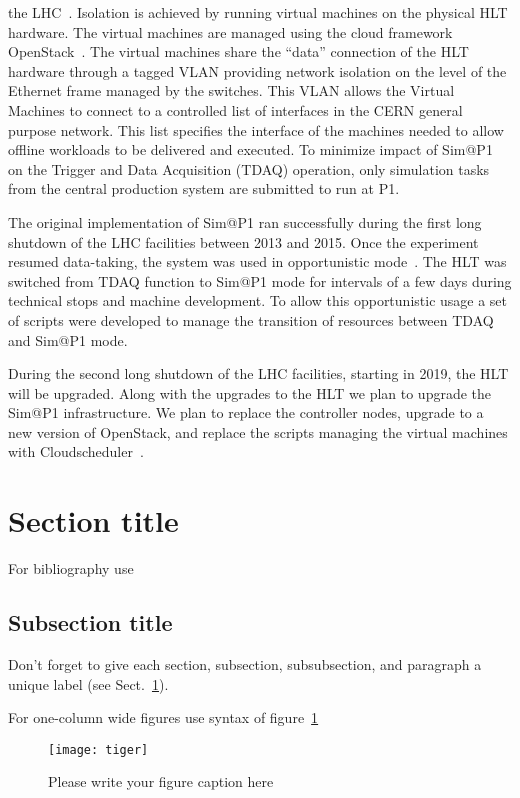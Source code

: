 \documentclass{webofc}
\begin{document}
the LHC~\cite{Ballestrero:2015ypa}. Isolation is achieved by running virtual
machines on the physical HLT hardware. The virtual machines are managed using the
cloud framework OpenStack~\cite{openstack}. The virtual machines share
the ``data'' connection of the HLT hardware through a tagged VLAN providing
network isolation on the level of the Ethernet frame managed by the switches. This
VLAN allows the Virtual Machines to connect to a controlled list of interfaces in
the CERN general purpose network. This list specifies the interface of the machines needed to allow offline workloads
to be delivered and executed. To minimize impact of Sim@P1 on the Trigger and Data Acquisition (TDAQ) operation, only
simulation tasks from the central production system are submitted to
run at P1.

The original implementation of Sim@P1 ran successfully during the first long
shutdown of the LHC facilities between 2013 and 2015. Once the experiment resumed
data-taking, the system was used in
opportunistic mode~\cite{Ballestrero:2017psv}. The HLT was switched from TDAQ
function to Sim@P1 mode
for intervals of a few days during technical stops and machine development. To
allow this opportunistic usage a set of scripts were developed to manage the
transition of resources between TDAQ and Sim@P1 mode.

During the second long shutdown of the LHC facilities, starting in 2019, the HLT
will be upgraded. Along with the upgrades to the HLT we plan to upgrade the Sim@P1
infrastructure. We plan to replace the controller nodes, upgrade to a new version
of OpenStack, and replace the scripts managing the virtual machines with
Cloudscheduler~\cite{Sobie:2013zua}.

\section{Section title}
\label{sec-1}
For bibliography use \cite{RefJ}
\subsection{Subsection title}
\label{sec-2}
Don't forget to give each section, subsection, subsubsection, and
paragraph a unique label (see Sect.~\ref{sec-1}).

For one-column wide figures use syntax of figure~\ref{fig-1}
\begin{figure}[h]
\centering
\texttt{[image: tiger]}
\caption{Please write your figure caption here}
\label{fig-1}       %
\end{figure}
\end{document}
